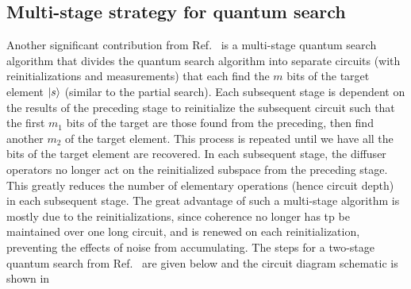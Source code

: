 \subsection{Multi-stage strategy for quantum search}
Another significant contribution from Ref.~\cite{Zhang_2020} is a multi-stage quantum search algorithm that divides the quantum search algorithm into separate circuits (with reinitializations and measurements) that each find the $m$ bits of the target element $\ket{s}$ (similar to the partial search). Each subsequent stage is dependent on the results of the preceding stage to reinitialize the subsequent circuit such that the first $m_1$ bits of the target are those found from the preceding, then find another $m_2$ of the target element. This process is repeated until we have all the bits of the target element are recovered. In each subsequent stage, the diffuser operators no longer act on the reinitialized subspace from the preceding stage. This greatly reduces the number of elementary operations (hence circuit depth) in each subsequent stage. The great advantage of such a multi-stage algorithm is mostly due to the reinitializations, since coherence no longer has tp be maintained over one long circuit, and is renewed on each reinitialization, preventing the effects of noise from accumulating. The steps for a two-stage quantum search from Ref.~\cite{Zhang_2020} are given below and the circuit diagram schematic is shown in~

